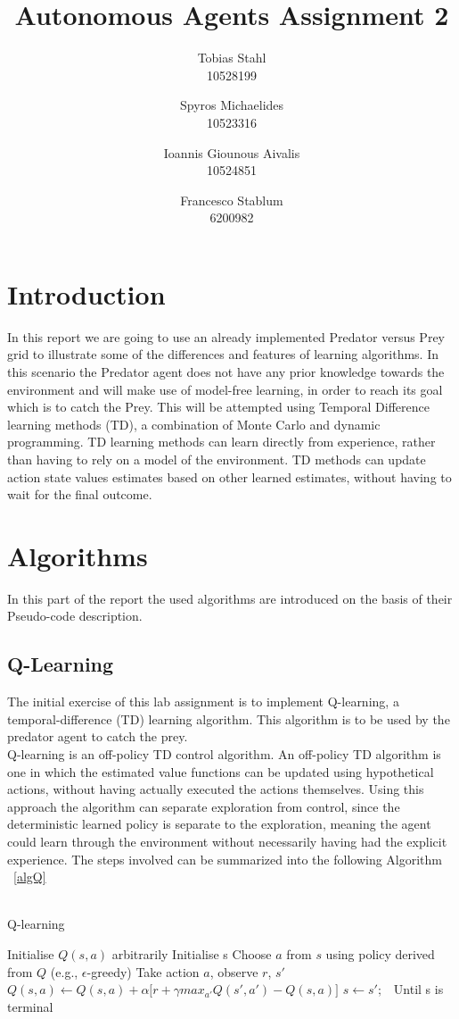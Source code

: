 \documentclass[11pt]{article}
\title{
	\textbf{Autonomous Agents Assignment 2}
}
\author{Tobias Stahl \\ 10528199 \and Spyros Michaelides \\ 10523316 \and Ioannis Giounous Aivalis \\ 10524851 \and Francesco Stablum \\ 6200982}
\begin{document}
\maketitle


\section{Introduction}
In this report we are going to use an already implemented Predator versus Prey grid to illustrate some of the differences and features of learning algorithms. In this scenario the Predator agent does not have any prior knowledge towards the environment and will make use of model-free learning, in order to reach its goal which is to catch the Prey. This will be attempted  using Temporal Difference learning methods (TD), a combination of Monte Carlo and dynamic programming. TD learning methods can learn directly from experience, rather than having to rely on a model of the environment. TD methods can update action state values estimates based on other learned estimates, without having to wait for the final outcome. 

\section{Algorithms}
In this part of the report the used algorithms are introduced on the basis of their Pseudo-code description.


\subsection{Q-Learning}
The initial exercise of this lab assignment is to implement Q-learning, a temporal-difference (TD) learning algorithm. This algorithm is to be used by the predator agent to catch the prey.\\
Q-learning is an off-policy TD control algorithm. An off-policy TD algorithm is one in which the estimated value functions can be updated using hypothetical actions, without having actually executed the actions themselves. Using this approach the algorithm can separate exploration from control, since the deterministic learned policy is separate to the exploration, meaning the agent could learn through the environment without necessarily having had the explicit experience.
The steps involved can be summarized into the following Algorithm ~\ref{algQ}\\\\


\begin{algorithm}
\caption{Q-learning}
\begin{algorithmic}[1]
\label{algQ}
\STATE Initialise $Q(s,a)$ arbitrarily
\STATE Initialise s
\STATE Choose $a$ from $s$ using policy derived from $Q$ (e.g., $\epsilon$-greedy)
\STATE Take action $a$, observe $r$, $s'$
\STATE $Q(s,a) \leftarrow Q(s,a) + \alpha \lbrack r + \gamma max_{a'} Q(s',a') - Q(s,a)\rbrack$
\STATE $s \leftarrow s';$\
\ENDFOR
\STATE Until s is terminal
\ENDFOR
\end{algorithmic}
\end{algorithm}
\end{document}

